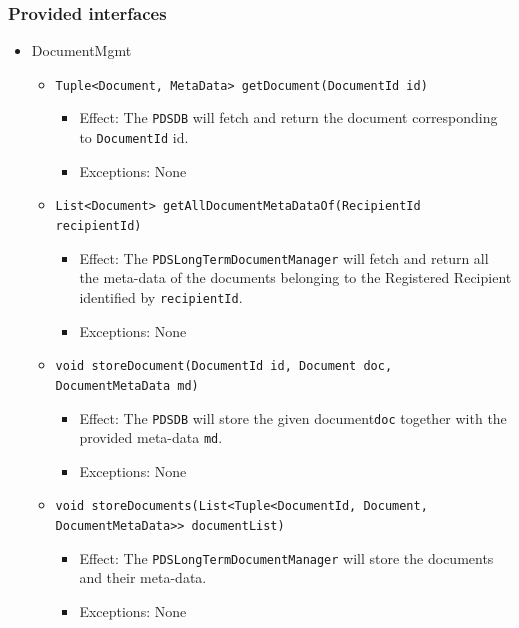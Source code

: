 \documentclass[a4paper,10pt]{article}
\begin{document}
\subsubsection*{Provided interfaces}
\begin{itemize}
    \item DocumentMgmt
    \begin{itemize}
        \item \texttt{Tuple<Document, MetaData> getDocument(DocumentId id)}
        \begin{itemize}
            \item Effect: The \texttt{PDSDB} will fetch and return the document corresponding to \texttt{DocumentId} id.
            \item Exceptions: None
         \end{itemize}
         
         \item \texttt{List<Document> getAllDocumentMetaDataOf(RecipientId recipientId)}
        \begin{itemize}
            \item Effect: The \texttt{PDSLongTermDocumentManager} will fetch and return all the meta-data of the documents belonging to the Registered Recipient identified by \texttt{recipientId}.
            \item Exceptions: None
         \end{itemize}   
         
		\item \texttt{void storeDocument(DocumentId id, Document doc, DocumentMetaData md)}
        \begin{itemize}
            \item Effect: The \texttt{PDSDB} will store the given document\texttt{doc} together with the provided meta-data \texttt{md}.
            \item Exceptions:  None 
        \end{itemize}
         
         \item \texttt{void storeDocuments(List<Tuple<DocumentId, Document, DocumentMetaData>> documentList)}
         \begin{itemize}
                \item Effect: The \texttt{PDSLongTermDocumentManager} will store the documents and their meta-data.
                \item Exceptions: None
         \end{itemize}
         

\end{itemize}
\end{itemize}
\end{document}
